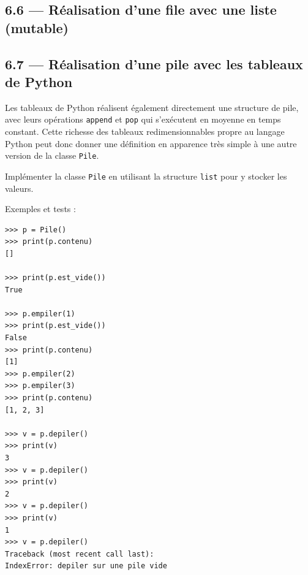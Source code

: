 \documentclass[a4paper,17pt]{extarticle}
\begin{document}
    \hypertarget{ruxe9alisation-dune-file-avec-une-liste-mutable}{%
\subsection{6.6 --- Réalisation d'une file avec une liste
(mutable)}\label{ruxe9alisation-dune-file-avec-une-liste-mutable}}

    \hypertarget{ruxe9alisation-dune-pile-avec-les-tableaux-de-python}{%
\subsection{6.7 --- Réalisation d'une pile avec les tableaux de
Python}\label{ruxe9alisation-dune-pile-avec-les-tableaux-de-python}}

    Les tableaux de Python réalisent également directement une structure de
pile, avec leurs opérations \texttt{append} et \texttt{pop} qui
s'exécutent en moyenne en temps constant. Cette richesse des tableaux
redimensionnables propre au langage Python peut donc donner une
définition en apparence très simple à une autre version de la classe
\texttt{Pile}.

Implémenter la classe \texttt{Pile} en utilisant la structure
\texttt{list} pour y stocker les valeurs.

Exemples et tests :

\begin{verbatim}
>>> p = Pile()
>>> print(p.contenu)
[]

>>> print(p.est_vide())
True

>>> p.empiler(1)
>>> print(p.est_vide())
False
>>> print(p.contenu)
[1]
>>> p.empiler(2)
>>> p.empiler(3)
>>> print(p.contenu)
[1, 2, 3]

>>> v = p.depiler()
>>> print(v)
3
>>> v = p.depiler()
>>> print(v)
2
>>> v = p.depiler()
>>> print(v)
1
>>> v = p.depiler()
Traceback (most recent call last):
IndexError: depiler sur une pile vide
 
\end{verbatim}
\end{document}
